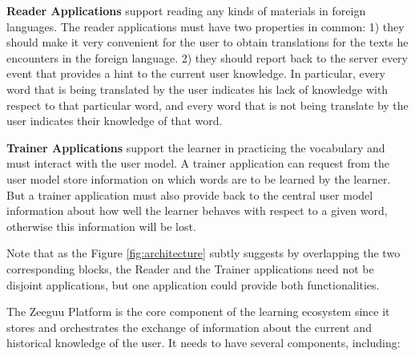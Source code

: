 \begin{description}
	
	\item {\bf Reader Applications} 
	support reading any kinds of materials in foreign languages. The reader applications must have two properties in common: 
		1) they should make it very convenient for the user to obtain translations for the texts he encounters in the foreign language. 
		2) they should report back to the server every event that provides a hint to the current user knowledge. In particular, every word that is being translated by the user indicates his lack of knowledge with respect to that particular word, and every word that is not being translate by the user indicates their knowledge of that word.
	
		\item {\bf Trainer Applications} support the learner in practicing the vocabulary and must interact with the user model. A trainer application can request from the user model store information on which words are to be learned by the learner. But a trainer application must also provide back to the central user model information about how well the learner behaves with respect to a given word, otherwise this information will be lost. 

\end{description}

Note that as the Figure \ref{fig:architecture} subtly suggests by overlapping the two corresponding blocks, the Reader and the Trainer applications need not be disjoint applications, but one application could provide both functionalities.


The Zeeguu Platform is the core component of the learning ecosystem since it stores and orchestrates the exchange of information about the current and historical knowledge of the user. It needs to have several components, including: 

